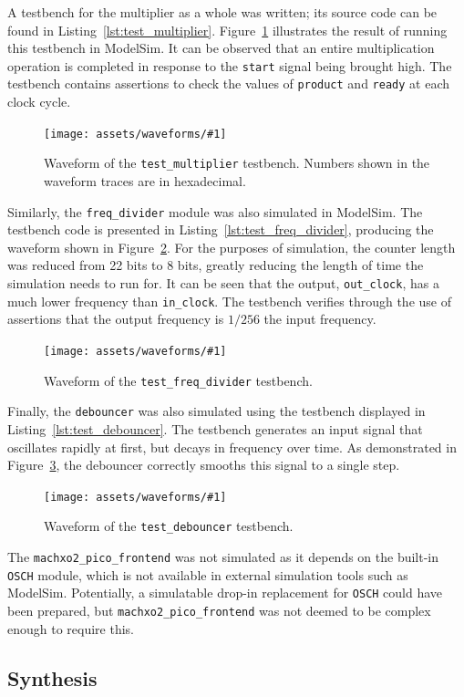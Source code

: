 \documentclass[a4paper]{article}
\newcommand{\waveformfigure}[2]{
  \begin{figure}[bp]
    \centering\texttt{[image: assets/waveforms/\#1]}
    \caption{#2}
    \label{fig:wave:#1}
  \end{figure}
}
\begin{document}
A testbench for the multiplier as a whole was written; its source code can be found in Listing~\ref{lst:test_multiplier}. Figure~\ref{fig:wave:test_multiplier} illustrates the result of running this testbench in ModelSim. It can be observed that an entire multiplication operation is completed in response to the \texttt{start} signal being brought high. The testbench contains assertions to check the values of \texttt{product} and \texttt{ready} at each clock cycle.

\waveformfigure{test_multiplier}{Waveform of the \texttt{test\_multiplier} testbench. Numbers shown in the waveform traces are in hexadecimal.}

Similarly, the \texttt{freq\_divider} module was also simulated in ModelSim. The testbench code is presented in Listing~\ref{lst:test_freq_divider}, producing the waveform shown in Figure~\ref{fig:wave:test_freq_divider}. For the purposes of simulation, the counter length was reduced from 22 bits to 8 bits, greatly reducing the length of time the simulation needs to run for. It can be seen that the output, \texttt{out\_clock}, has a much lower frequency than \texttt{in\_clock}. The testbench verifies through the use of assertions that the output frequency is $1/256$ the input frequency.

\waveformfigure{test_freq_divider}{Waveform of the \texttt{test\_freq\_divider} testbench.}

Finally, the \texttt{debouncer} was also simulated using the testbench displayed in Listing~\ref{lst:test_debouncer}. The testbench generates an input signal that oscillates rapidly at first, but decays in frequency over time. As demonstrated in Figure~\ref{fig:wave:test_debouncer}, the debouncer correctly smooths this signal to a single step.

\waveformfigure{test_debouncer}{Waveform of the \texttt{test\_debouncer} testbench.}

The \texttt{machxo2\_pico\_frontend} was not simulated as it depends on the built-in \texttt{OSCH} module, which is not available in external simulation tools such as ModelSim. Potentially, a simulatable drop-in replacement for \texttt{OSCH} could have been prepared, but \texttt{machxo2\_pico\_frontend} was not deemed to be complex enough to require this.

\subsection{Synthesis}
\label{sec:mult:synth}
\end{document}

